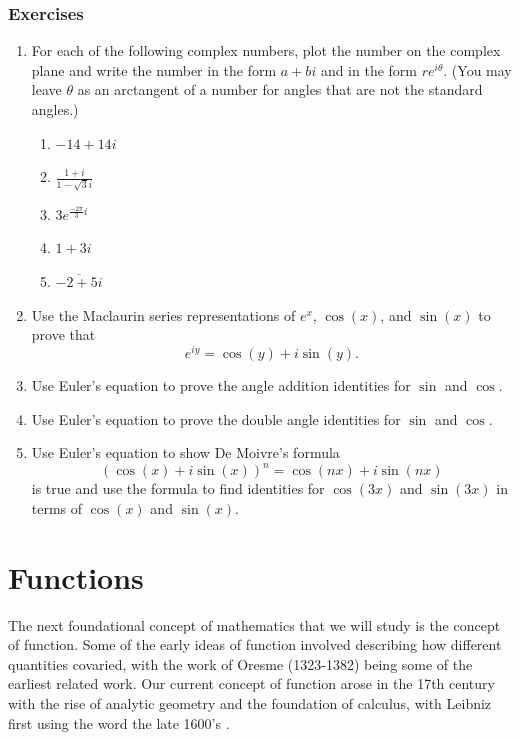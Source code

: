 \documentclass[
]{book}
\theoremstyle{definition}
\theoremstyle{definition}
\theoremstyle{definition}
\theoremstyle{remark}
\begin{document}
\hypertarget{exercises-15}{%
\subsection{Exercises}\label{exercises-15}}

\begin{enumerate}
\def\labelenumi{\arabic{enumi}.}
\item
  For each of the following complex numbers, plot the number on the complex plane and write the number in the form \(a+bi\) and in the form \(re^{i\theta}\). (You may leave \(\theta\) as an arctangent of a number for angles that are not the standard angles.)

  \begin{enumerate}
  \def\labelenumii{\alph{enumii}.}
  \item
    \(-14+14i\)
  \item
    \(\displaystyle{\frac{1+i}{1-\sqrt{3}i}}\)
  \item
    \(\displaystyle{3e^{\frac{-2\pi}{3}i}}\)
  \item
    \(1+3i\)
  \item
    \(\displaystyle{\overline{-2+5i}}\)
  \end{enumerate}
\item
  Use the Maclaurin series representations of \(e^x\), \(\cos(x)\), and \(\sin(x)\) to prove that \[e^{iy}=\cos(y) + i \sin(y).\]
\item
  Use Euler's equation to prove the angle addition identities for \(\sin\) and \(\cos\).
\item
  Use Euler's equation to prove the double angle identities for \(\sin\) and \(\cos\).
\item
  Use Euler's equation to show De Moivre's formula
  \[\left(\cos(x) + i \sin(x) \right)^n = \cos(nx) + i\sin(nx) \] is true and use the formula to find identities for \(\cos(3x)\) and \(\sin(3x)\) in terms of \(\cos(x)\) and \(\sin(x)\).
\end{enumerate}

\hypertarget{ch:function}{%
\chapter{Functions}\label{ch:function}}

The next foundational concept of mathematics that we will study is the concept of function. Some of the early ideas of function involved describing how different quantities covaried, with the work of Oresme (1323-1382) being some of the earliest related work. Our current concept of function arose in the 17th century with the rise of analytic geometry and the foundation of calculus, with Leibniz first using the word the late 1600's \citep{Ponte1992}.
\end{document}

